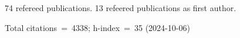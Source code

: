 74 refereed publications. 13 refeered publications as first author.

Total citations~=~4338; h-index~=~35 (2024-10-06)